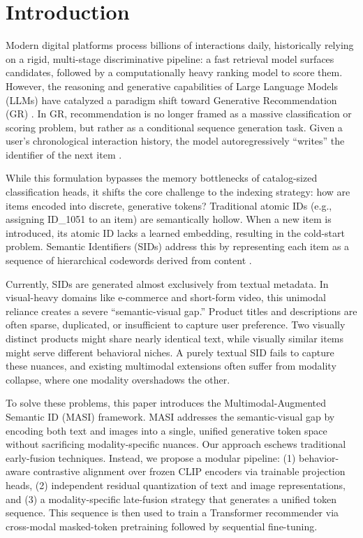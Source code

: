 \documentclass[conference]{IEEEtran}
\begin{document}
\section{Introduction}
Modern digital platforms process billions of interactions daily, historically relying on a rigid, multi-stage discriminative pipeline: a fast retrieval model surfaces candidates, followed by a computationally heavy ranking model to score them. However, the reasoning and generative capabilities of Large Language Models (LLMs) have catalyzed a paradigm shift toward Generative Recommendation (GR) \cite{liang2025generative}. In GR, recommendation is no longer framed as a massive classification or scoring problem, but rather as a conditional sequence generation task. Given a user's chronological interaction history, the model autoregressively ``writes'' the identifier of the next item \cite{rajput2023recommender,yang2025gr}.

While this formulation bypasses the memory bottlenecks of catalog-sized classification heads, it shifts the core challenge to the indexing strategy: how are items encoded into discrete, generative tokens? Traditional atomic IDs (e.g., assigning ID\_1051 to an item) are semantically hollow. When a new item is introduced, its atomic ID lacks a learned embedding, resulting in the cold-start problem. Semantic Identifiers (SIDs) address this by representing each item as a sequence of hierarchical codewords derived from content \cite{singh2024better,lee2022autoregressive}.

Currently, SIDs are generated almost exclusively from textual metadata. In visual-heavy domains like e-commerce and short-form video, this unimodal reliance creates a severe ``semantic-visual gap.'' Product titles and descriptions are often sparse, duplicated, or insufficient to capture user preference. Two visually distinct products might share nearly identical text, while visually similar items might serve different behavioral niches. A purely textual SID fails to capture these nuances, and existing multimodal extensions often suffer from modality collapse, where one modality overshadows the other.

To solve these problems, this paper introduces the Multimodal-Augmented Semantic ID (MASI) framework. MASI addresses the semantic-visual gap by encoding both text and images into a single, unified generative token space without sacrificing modality-specific nuances. Our approach eschews traditional early-fusion techniques. Instead, we propose a modular pipeline: (1) behavior-aware contrastive alignment over frozen CLIP encoders via trainable projection heads, (2) independent residual quantization of text and image representations, and (3) a modality-specific late-fusion strategy that generates a unified token sequence. This sequence is then used to train a Transformer recommender via cross-modal masked-token pretraining followed by sequential fine-tuning.
\end{document}
